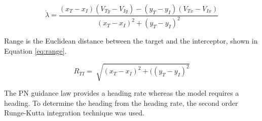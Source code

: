 \documentclass[conference]{IEEEtran}
\begin{document}
\begin{equation} \label{eq:losrate}
\dot{\lambda} = \frac{(x_T - x_I)(V_{Ty}-V_{Iy}) - (y_T - y_I)(V_{Tx}-V_{Ix})}{(x_T - x_I)^2+(y_T - y_I)^2}
\end{equation}



%

Range is the Euclidean distance between the target and the interceptor, shown in Equation \ref{eq:range}. 

\begin{equation} \label{eq:range}
R_{TI} =\sqrt[]{(x_T - x_I)^2+((y_T - y_I)^2}
\end{equation}



The PN guidance law provides a heading rate whereas the model requires a heading. To determine the heading from the heading rate, the second order Runge-Kutta integration technique was used. 


\end{document}
